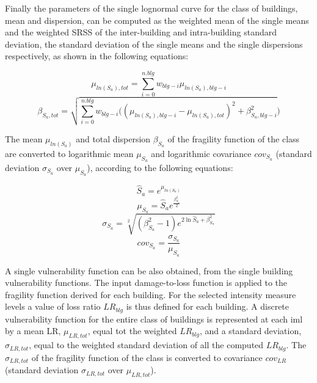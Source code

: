 Finally the parameters of the single lognormal curve for the class of buildings, mean and dispersion, can be computed as the weighted mean of the single means and the weighted SRSS of the inter-building and intra-building standard deviation, the standard deviation of the single means and the single dispersions respectively, as shown in the following equations:

\begin{equation}
\mu_{ln(S_a), tot} = \sum_{i=0}^{n.blg} w_{blg-i} \mu_{ln(S_a), blg-i}
\label{eq:combination-lognormals-mu}
\end{equation}
\begin{equation}
\beta_{S_a, tot} = \sqrt{ \sum_{i=0}^{n.blg} w_{blg-i} ((\mu_{ln(S_a), blg-i}-\mu_{ln(S_a), tot})^2+ \beta_{S_a, blg-i}^2})
\label{eq:combination-lognormals-sigma}
\end{equation}

The mean $\mu_{ln(S_a)}$ and total dispersion $\beta_{S_a}$ of the fragility function of the class are converted to logarithmic mean $\mu_{S_a}$ and logarithmic covariance $cov_{S_a}$ (standard deviation $\sigma_{S_a}$ over $\mu_{S_a}$), according to the following equations:

\begin{equation}
\hat{S}_a = e^{\mu_{ln(S_a)}}
\end{equation}
\begin{equation}
\mu_{S_a} = \hat{S}_a e^{\frac{\beta_{S_a}^2}{2}}
\label{eq:median-to-mean}
\end{equation}
\begin{equation}
\sigma_{S_a} = \sqrt[2]{(\beta_{S_a}^2-1) e^{2\ln{ \hat{S}_a}+\beta_{S_a}^2}}
\label{eq:dispersion-to-standard}
\end{equation}
\begin{equation}
cov_{S_a} = \frac{\sigma_{S_a}}{\mu_{S_a} }
\end{equation}

A single vulnerability function can be also obtained, from the single building vulnerability functions. The input damage-to-loss function is applied to the fragility function derived for each building. For the selected intensity measure levels a value of loss ratio $LR_{blg}$ is thus defined for each building. A discrete vulnerability function for the entire class of buildings is represented at each iml by a mean LR, $\mu_{LR,tot}$, equal tot the weighted $LR_{blg}$, and a standard deviation, $\sigma_{LR, tot}$, equal to the weighted standard deviation of all the computed $LR_{blg}$. The $\sigma_{LR, tot}$ of the fragility function of the class is converted to covariance $cov_{LR}$ (standard deviation $\sigma_{LR, tot}$ over $\mu_{LR, tot}$).

